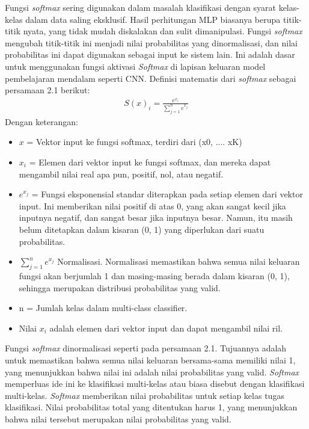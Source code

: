 \begin{enumerate}
    Fungsi \textit{softmax} sering digunakan dalam masalah klasifikasi dengan syarat kelas-kelas dalam data saling eksklusif. Hasil perhitungan MLP biasanya berupa titik-titik nyata, yang tidak mudah diskalakan dan sulit dimanipulasi. Fungsi \textit{softmax} mengubah titik-titik ini menjadi nilai probabilitas yang dinormalisasi, dan nilai probabilitas ini dapat digunakan sebagai input ke sistem lain. Ini adalah dasar untuk menggunakan fungsi aktivasi \textit{Softmax} di lapisan keluaran model pembelajaran mendalam seperti CNN. Definisi matematis dari \textit{softmax} sebagai persamaan 2.1 berikut:
    \begin{equation}
        \label{eq:softmax}
        \begin{split}
            S(x)_i = \frac{e^{x_i}}{\sum_{j=1}^{n} e^{x_j}}
        \end{split}
    \end{equation}
    Dengan keterangan:
    \begin{itemize}
        \item \(x\) = Vektor input ke fungsi softmax, terdiri dari (x0, .... xK)
        \item \(x_i\)  = Elemen dari vektor input ke fungsi softmax, dan mereka dapat mengambil nilai real apa pun, positif, nol, atau negatif.
        \item \(e^{x_j}\) = Fungsi eksponensial standar diterapkan pada setiap elemen dari vektor input. Ini memberikan nilai positif di atas 0, yang akan sangat kecil jika inputnya negatif, dan sangat besar jika inputnya besar. Namun, itu masih belum ditetapkan dalam kisaran (0, 1) yang diperlukan dari suatu probabilitas.
        \item \({\sum_{j=1}^{n} e^{x_j}}\) Normalisasi. Normalisasi memastikan bahwa semua nilai keluaran fungsi akan berjumlah 1 dan masing-masing berada dalam kisaran (0, 1), sehingga merupakan distribusi probabilitas yang valid.
        \item n = Jumlah kelas dalam multi-class classifier.
        \item Nilai \(x_i\) adalah elemen dari vektor input dan dapat mengambil nilai ril.
    \end{itemize}
    Fungsi \textit{softmax} dinormalisasi seperti pada persamaan 2.1. Tujuannya adalah untuk memastikan bahwa semua nilai keluaran bersama-sama memiliki nilai 1, yang menunjukkan bahwa nilai ini adalah nilai probabilitas yang valid. \textit{Softmax} memperluas ide ini ke klasifikasi multi-kelas atau biasa disebut dengan klasifikasi multi-kelas. \textit{Softmax} memberikan nilai probabilitas untuk setiap kelas tugas klasifikasi. Nilai probabilitas total yang ditentukan harus 1, yang menunjukkan bahwa nilai tersebut merupakan nilai probabilitas yang valid.

\end{enumerate}

